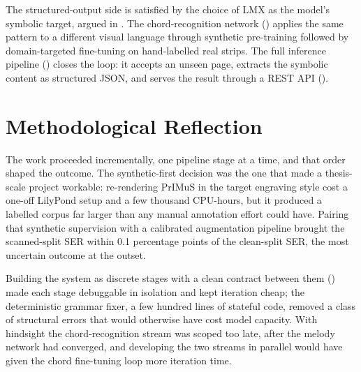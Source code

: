The structured-output side is satisfied by the choice of LMX as the
model's symbolic target, argued in
. The chord-recognition network
() applies the same pattern to a different visual
language through synthetic pre-training followed by domain-targeted
fine-tuning on hand-labelled real strips. The full inference pipeline
() closes the loop: it accepts an unseen
page, extracts the symbolic content as structured JSON, and serves the
result through a REST API ().

\section{Methodological Reflection}
\label{sec:conc-reflection}

The work proceeded incrementally, one pipeline stage at a time, and
that order shaped the outcome. The synthetic-first decision was the
one that made a thesis-scale project workable: re-rendering PrIMuS in
the target engraving style cost a one-off LilyPond setup and a few
thousand CPU-hours, but it produced a labelled corpus far larger than
any manual annotation effort could have. Pairing that synthetic
supervision with a calibrated augmentation pipeline brought the
scanned-split SER within \num{0.1} percentage points of the
clean-split SER, the most uncertain outcome at the outset.

Building the system as discrete stages with a clean contract between
them () made each stage debuggable in
isolation and kept iteration cheap; the deterministic grammar fixer,
a few hundred lines of stateful code, removed a class of structural
errors that would otherwise have cost model capacity. With hindsight
the chord-recognition stream was scoped too late, after the melody network had
converged, and developing the two streams in parallel would have given
the chord fine-tuning loop more iteration time.
